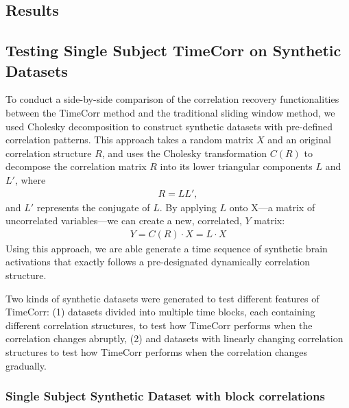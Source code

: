 \documentclass[11pt]{article}
\begin{document}
\begin{enumerate}
\newpage
\section{Results}
\subsection{Testing Single Subject TimeCorr on Synthetic Datasets}
To conduct a side-by-side comparison of the correlation recovery functionalities between the TimeCorr method and the traditional sliding window method, we used Cholesky decomposition to construct synthetic datasets with pre-defined correlation patterns. This approach takes a random matrix $X$ and an original correlation structure $R$, and uses the Cholesky transformation $C(R)$ to decompose the correlation matrix $R$ into its lower triangular components $L$ and $L'$, where
\begin{align*}
R = LL',
\end{align*}
and $L'$ represents the conjugate of $L$. By applying $L$ onto X---a matrix of uncorrelated variables---we can create a new, correlated, $Y$ matrix:
\begin{align*}
Y = C(R) \cdot X = L \cdot X
\end{align*}
Using this approach, we are able generate a time sequence of synthetic brain activations that exactly follows a pre-designated dynamically correlation structure.

Two kinds of synthetic datasets were generated to test different features of TimeCorr: (1) datasets divided into multiple time blocks, each containing different correlation structures, to test how TimeCorr performs when the correlation changes abruptly, (2) and datasets with linearly changing correlation structures to test how TimeCorr performs when the correlation changes gradually.

\subsubsection{Single Subject Synthetic Dataset with block correlations}


\end{enumerate}
\end{document}
